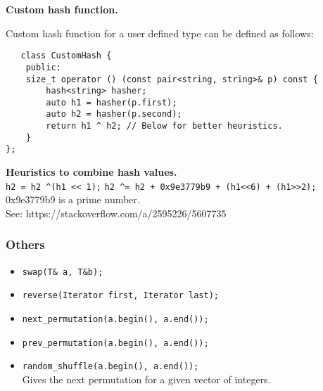 \textbf{Custom hash function.}

Custom hash function for a user defined type can be defined as follows:
\begin{verbatim}
   class CustomHash {
    public:
    size_t operator () (const pair<string, string>& p) const {
        hash<string> hasher;
        auto h1 = hasher(p.first);
        auto h2 = hasher(p.second);
        return h1 ^ h2; // Below for better heuristics.
    }
}; 
\end{verbatim}

\textbf{Heuristics to combine hash values.}\\
\texttt{h2 = h2 \textasciicircum (h1 << 1);}
\texttt{h2 \textasciicircum= h2 + 0x9e3779b9 + (h1<<6) + (h1>>2);}\\
0x9e3779b9 is a prime number.\\
See: https://stackoverflow.com/a/2595226/5607735\\


\subsubsection{Others}

\begin{itemize}
\item \texttt{swap(T\& a, T\&b);}\\
\item \texttt{reverse(Iterator first, Iterator last);}
\item \texttt{next\_permutation(a.begin(), a.end());}\\
\item \texttt{prev\_permutation(a.begin(), a.end());}\\
\item \texttt{random\_shuffle(a.begin(), a.end());}\\
Gives the next permutation for a given vector of integers.
\end{itemize}

\vfill \null
\columnbreak 


